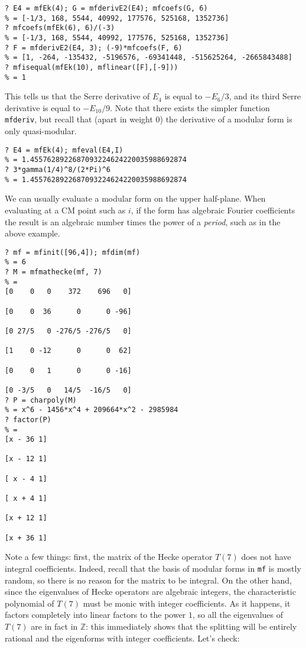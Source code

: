 \documentclass[11pt]{article}
\newcommand{\Z}{{\mathbb Z}}
\def\kbd#1{{\tt #1}}
\begin{document}
\medskip

\begin{verbatim}
? E4 = mfEk(4); G = mfderivE2(E4); mfcoefs(G, 6)
% = [-1/3, 168, 5544, 40992, 177576, 525168, 1352736]
? mfcoefs(mfEk(6), 6)/(-3)
% = [-1/3, 168, 5544, 40992, 177576, 525168, 1352736]
? F = mfderivE2(E4, 3); (-9)*mfcoefs(F, 6)
% = [1, -264, -135432, -5196576, -69341448, -515625264, -2665843488]
? mfisequal(mfEk(10), mflinear([F],[-9]))
% = 1
\end{verbatim}

This tells us that the Serre derivative of $E_4$ is equal to $-E_6/3$,
and its third Serre derivative is equal to $-E_{10}/9$. Note that there
exists the simpler function \kbd{mfderiv}, but recall that (apart in weight
$0$) the derivative of a modular form is only quasi-modular.

\medskip

\begin{verbatim}
? E4 = mfEk(4); mfeval(E4,I)
% = 1.4557628922687093224624220035988692874
? 3*gamma(1/4)^8/(2*Pi)^6
% = 1.4557628922687093224624220035988692874
\end{verbatim}

We can usually evaluate a modular form on the upper half-plane. When
evaluating at a CM point such as $i$, if the form has algebraic
Fourier coefficients the result is an algebraic number times the power
of a \emph{period}, such as in the above example.

\medskip

\begin{verbatim}
? mf = mfinit([96,4]); mfdim(mf)
% = 6
? M = mfmathecke(mf, 7)
% =
[0    0   0    372    696   0]

[0    0  36      0      0 -96]

[0 27/5   0 -276/5 -276/5   0]

[1    0 -12      0      0  62]

[0    0   1      0      0 -16]

[0 -3/5   0   14/5  -16/5   0]
? P = charpoly(M)
% = x^6 - 1456*x^4 + 209664*x^2 - 2985984
? factor(P)
% =
[x - 36 1]

[x - 12 1]

[ x - 4 1]

[ x + 4 1]

[x + 12 1]

[x + 36 1]
\end{verbatim}

Note a few things: first, the matrix of the Hecke operator $T(7)$ does not
have integral coefficients. Indeed, recall that the basis of modular forms
in \kbd{mf} is mostly random, so there is no reason for the matrix to be
integral. On the other hand, since the eigenvalues of Hecke operators are
algebraic integers, the characteristic polynomial of $T(7)$ must be monic
with integer coefficients. As it happens, it factors completely into
linear factors to the power $1$, so all the eigenvalues of $T(7)$ are in
fact in $\Z$: this immediately shows that the splitting will be entirely
rational and the eigenforms with integer coefficients. Let's check:
\end{document}
